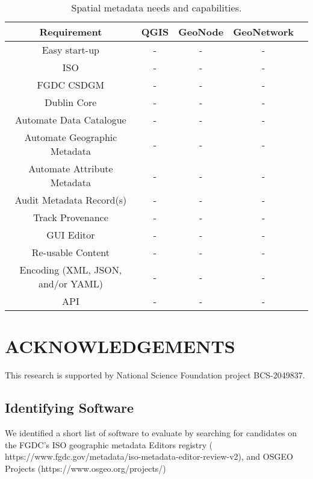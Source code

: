 \documentclass{isprs} %
\begin{document}
\begin{table*}[h]
	\centering
		\begin{tabular}{|c|c|c|c|c|}\hline
		    Requirement&QGIS&GeoNode&GeoNetwork\\\hline
			 Easy start-up & - & - & - \\
			 ISO & - & - & - \\
			 FGDC CSDGM & - & - & - \\
			 Dublin Core & - & - & - \\
			 Automate Data Catalogue & - & - & - \\
			 Automate Geographic Metadata & - & - & - \\
			 Automate Attribute Metadata & - & - & - \\
			 Audit Metadata Record(s) & - & - & - \\
			 Track Provenance & - & - & - \\
 			 GUI Editor & - & - & - \\
 			 Re-usable Content & - & - & - \\
			 Encoding (XML, JSON, and/or YAML) & - & - & - \\
			 API & - & - & - \\\hline
		\end{tabular}
	\caption{Spatial metadata needs and capabilities.}
\label{tab:Metadata_Software}
\end{table*}

\section*{ACKNOWLEDGEMENTS}\label{ACKNOWLEDGEMENTS}
This research is supported by National Science Foundation project BCS-2049837.

{
	\begin{spacing}{1.17}
		\normalsize
	\end{spacing}
}

\subsection{Identifying Software}\label{software}

We identified a short list of software to evaluate by searching for candidates on the FGDC's ISO geographic metadata Editors registry ( https://www.fgdc.gov/metadata/iso-metadata-editor-review-v2), and OSGEO Projects (https://www.osgeo.org/projects/)
\end{document}

